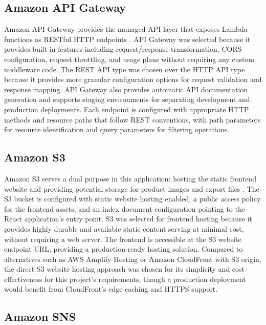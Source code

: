 \documentclass[conference]{IEEEtran}
\begin{document}
\subsection{Amazon API Gateway}

Amazon API Gateway provides the managed API layer that exposes Lambda functions as RESTful HTTP endpoints \cite{awsapigateway}. API Gateway was selected because it provides built-in features including request/response transformation, CORS configuration, request throttling, and usage plans without requiring any custom middleware code. The REST API type was chosen over the HTTP API type because it provides more granular configuration options for request validation and response mapping. API Gateway also provides automatic API documentation generation and supports staging environments for separating development and production deployments. Each endpoint is configured with appropriate HTTP methods and resource paths that follow REST conventions, with path parameters for resource identification and query parameters for filtering operations.

\subsection{Amazon S3}

Amazon S3 serves a dual purpose in this application: hosting the static frontend website and providing potential storage for product images and export files \cite{awss3}. The S3 bucket is configured with static website hosting enabled, a public access policy for the frontend assets, and an index document configuration pointing to the React application's entry point. S3 was selected for frontend hosting because it provides highly durable and available static content serving at minimal cost, without requiring a web server. The frontend is accessible at the S3 website endpoint URL, providing a production-ready hosting solution. Compared to alternatives such as AWS Amplify Hosting or Amazon CloudFront with S3 origin, the direct S3 website hosting approach was chosen for its simplicity and cost-effectiveness for this project's requirements, though a production deployment would benefit from CloudFront's edge caching and HTTPS support.

\subsection{Amazon SNS}
\end{document}
